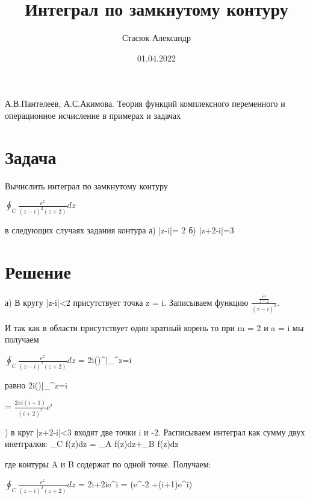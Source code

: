 \documentclass{article}
\title{Интеграл по замкнутому контуру}
\author{Стасюк Александр}
\date{01.04.2022}
\begin{document}
\maketitle
\begin{thebibliography}{1}
А.В.Пантелеев, А.С.Акимова. Теория функций комплексного переменного
и операционное исчисление в примерах и задачах

\end{thebibliography}
\section{Задача}

Вычислить интеграл по замкнутому контуру

$\oint_C \frac{e^z}{(z-i)^2(z+2)}dz$

в следующих случаях задания контура а) |z-i|= 2 б) |z+2-i|=3

\section{Решение}

а) В кругу |z-i|<2 присутствует точка z = i. Записываем
функцию 
$\frac{\frac{e^z}{z+2}}{(z-i)^2}$.

И так как в области присутствует один кратный корень то при m = 2 и a = i мы получаем

\par \noindent$\oint_C \frac{e^z}{(z-i)^2(z+2)}dz$ = 2\pi i()^\prime\bigg|_^z=i
\par{} равно 2\pi i()|_^z=i
\par\noindent= $\frac{2\pi i(i+1)}{(i+2)^2}e^i$
\par{}) в круг |z+2-i|<3 входят две точки i и -2. Расписываем интеграл как сумму двух инетгралов:  \oint_C f(z)dz = \oint_A f(z)dz+\oint_B f(z)dz
\par\noindent где контуры A и B содержат по одной точке. Получаем:
\par\noindent$\oint_C \frac{e^z}{(z-i)^2(z+2)}dz$ = 2\pi i+2\pi ie^i = (e^-2 +(i+1)e^i)
\end{document}
